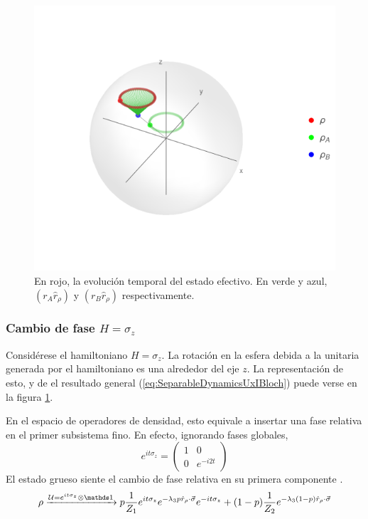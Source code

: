 \begin{figure}[h!]
    \centering
    \includegraphics[width=0.6\linewidth]{maxent/figures/U1xU2_H1=sz_H2=Id_z=0.9_p=0.4_sequence.png}
    \caption{En rojo, la evolución temporal del estado efectivo. En verde y azul, $(r_{A}\hat{r}_{\rho})$ y $(r_{B}\hat{r}_{\rho})$ respectivamente.}
    \label{fig:ZRot}
\end{figure}

\subsubsection{Cambio de fase $H=\sigma_{z}$}
Considérese el hamiltoniano $H=\sigma_{z}$. La rotación en la esfera debida a la unitaria generada por el hamiltoniano es una alrededor del eje $z$. La representación de esto, y de el resultado general (\ref{eq:SeparableDynamicsUxIBloch}) puede verse en la figura \ref{fig:ZRot}.


En el espacio de operadores de densidad, esto equivale a insertar una fase relativa en el primer subsistema fino. En efecto, ignorando fases globales,
\begin{equation}
    e^{it\sigma_{z}}=\begin{pmatrix}
        1&0\\0&e^{-i2t}
    \end{pmatrix}
\end{equation}
El estado grueso siente el cambio de fase relativa en su primera componente .
\begin{equation}
    \rho\xrightarrow{\mcU=e^{it\sigma_{z}}\otimes \Id} p\frac{1}{Z_{1}}e^{it\sigma_{z}}e^{-\lambda_{3}p\hat{r}_{\rho}\cdot\vec{\sigma}}e^{-it\sigma_{z}}+(1-p)\frac{1}{Z_{2}}e^{-\lambda_{3}(1-p)\hat{r}_{\rho}\cdot\vec{\sigma}}
\end{equation}


